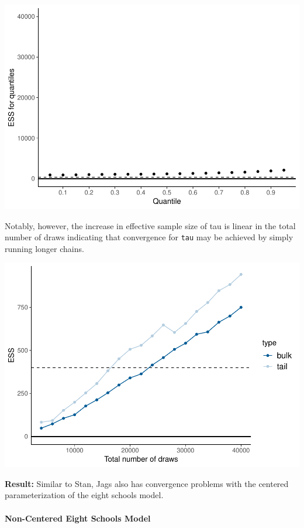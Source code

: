 \documentclass[american,]{article}
\let\oldparagraph\paragraph
\renewcommand{\paragraph}[1]{\oldparagraph{#1}\mbox{}}
\begin{document}
\includegraphics{graphics/quantile-ess-jags-cp-tau-longer-1.pdf}

Notably, however, the increase in effective sample size of tau is linear
in the total number of draws indicating that convergence for
\texttt{tau} may be achieved by simply running longer chains.

\includegraphics{graphics/change-ess-jags-cp-tau-longer-1.pdf}

\textbf{Result:} Similar to Stan, Jags also has convergence problems
with the centered parameterization of the eight schools model.

\hypertarget{non-centered-eight-schools-model-2}{%
\paragraph{Non-Centered Eight Schools
Model}\label{non-centered-eight-schools-model-2}}
\end{document}

